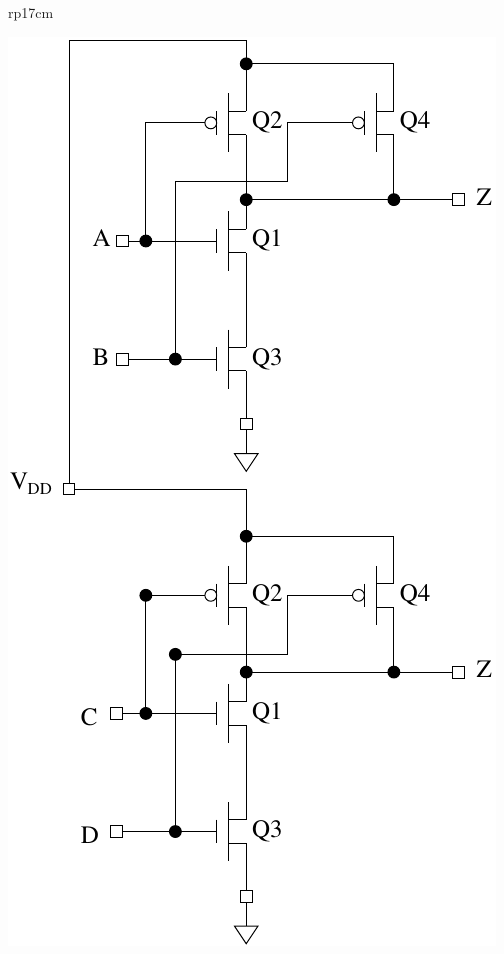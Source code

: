 \documentclass{article}
\begin{document}
\begin{longtable}[l]{rp{17cm}}
\begin{minipage}[t]{\linewidth}
\includegraphics{../CMOSCircuits/Assessments/CMOSNANDNOR}


\end{minipage}
\end{longtable}
\end{document}

